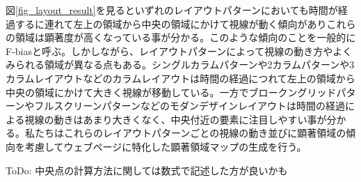 \par 図\ref{fig_layout_result}を見るといずれのレイアウトパターンにおいても時間が経過するに連れて左上の領域から中央の領域にかけて視線が動く傾向がありこれらの領域は顕著度が高くなっている事が分かる。このような傾向のことを一般的にF-biasと呼ぶ。しかしながら、レイアウトパターンによって視線の動き方やよくみられる領域が異なる点もある。シングルカラムパターンや2カラムパターンや3カラムレイアウトなどのカラムレイアウトは時間の経過につれて左上の領域から中央の領域にかけて大きく視線が移動している。一方でブロークングリッドパターンやフルスクリーンパターンなどのモダンデザインレイアウトは時間の経過による視線の動きはあまり大きくなく、中央付近の要素に注目しやすい事が分かる。私たちはこれらのレイアウトパターンごとの視線の動き並びに顕著領域の傾向を考慮してウェブページに特化した顕著領域マップの生成を行う。

ToDo: 中央点の計算方法に関しては数式で記述した方が良いかも
